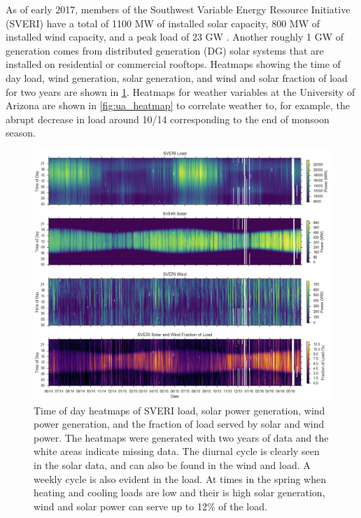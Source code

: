As of early 2017, members of the Southwest Variable Energy Resource
Initiative (SVERI) have a total of 1100 MW of installed solar capacity,
800 MW of installed wind capacity, and a peak load of 23 GW
\citep{sveri_website}.
Another roughly 1 GW of generation comes from distributed generation
(DG) solar systems that are installed on residential or commercial
rooftops.
Heatmaps showing the time of day load, wind generation, solar generation, and
wind and solar fraction of load for two years are shown in
\cref{fig:sveri_heatmap}.
Heatmaps for weather variables at the University of Arizona are shown
in \cref{fig:ua_heatmap} to correlate weather to, for example, the
abrupt decrease in load around 10/14 corresponding to the end of monsoon season.

\begin{figure}[p]
\centering
\includegraphics[width=\textwidth]{figs/sveri_heat.png}
\caption[Heatmaps of SVERI load, solar power, wind power, and
renewable load fraction]{Time of day heatmaps of SVERI load, solar
  power generation, wind power generation, and the fraction of load
  served by solar and wind power. The heatmaps were generated with two
  years of data and the white areas indicate missing data. The diurnal
  cycle is clearly seen in the solar data, and can also be found in
  the wind and load. A weekly cycle is also evident in the load. At
  times in the spring when heating and cooling loads are low and their
  is high solar generation, wind and solar power can serve up to 12\%
  of the load.}
\label{fig:sveri_heatmap}
\end{figure}

